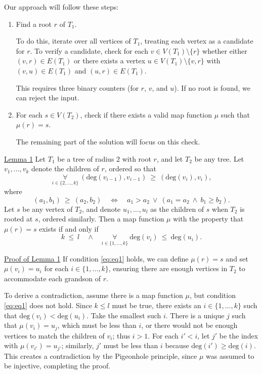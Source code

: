 \documentclass[12pt]{article}
\begin{document}
	Our approach will follow these steps:
	\begin{enumerate}
		\item Find a root \(r\) of \(T_{1}\).
		      
		      To do this, iterate over all vertices of \(T_{1}\), treating each
		      vertex as a candidate for \(r\). To verify a candidate, check for
		      each \(v \in V(T_{1}) \setminus \{r\}\) whether either \((v, r)
		      \in E(T_{1})\) or there exists a vertex \(u \in V(T_{1}) \setminus
		      \{v, r\}\) with \((v, u) \in E(T_{1})\) and \((u, r) \in
		      E(T_{1})\).
		      
		      This requires three binary counters (for \(r\), \(v\), and \(u\)).
		      If no root is found, we can reject the input.
		
		\item For each \(s \in V(T_{2})\), check if there exists a valid map
		      function \(\mu\) such that \(\mu(r) = s\).
		      
		      The remaining part of the solution will focus on this check.
	\end{enumerate}
	
	\underline{Lemma 1} Let \(T_{1}\) be a tree of radius \(2\) with root \(r\),
	and let \(T_{2}\) be any tree. Let \(v_{1}, \ldots, v_{k}\) denote the
	children of \(r\), ordered so that
	\[ \underset{i \in \{2, \ldots, k\}}{\forall} \ (\text{deg}(v_{i - 1}),
	v_{i - 1}) \ \geqslant \ (\text{deg}(v_{i}), v_{i}) \text{,} \]
	where
	\[ (a_{1}, b_{1}) \ \geqslant \ (a_{2}, b_{2}) \quad \iff \quad a_{1} >
	a_{2} \ \vee \ (a_{1} = a_{2} \ \wedge \ b_{1} \geqslant b_{2}) \text{.} \]
	Let \(s\) be any vertex of \(T_{2}\), and denote \(u_{1}, \ldots, u_{l}\)
	as the children of \(s\) when \(T_{2}\) is rooted at \(s\), ordered
	similarly. Then a map function \(\mu\) with the property that \(\mu(r) = s\)
	exists if and only if
	\begin{equation} \label{eq:eq1}
		k \ \leqslant \ l \quad \wedge \quad \underset{i \in \{1, \ldots, k\}}
		{\forall} \ \text{deg}(v_{i}) \ \leqslant \ \text{deg}(u_{i}) \text{.}
	\end{equation}
	
	\underline{Proof of Lemma 1} If condition \ref{eq:eq1} holds, we can define
	\(\mu(r) = s\) and set \(\mu(v_{i}) = u_{i}\) for each \(i \in \{1, \ldots,
	k\}\), ensuring there are enough vertices in \(T_{2}\) to accommodate each
	grandson of \(r\).
	
	\medskip
	
	To derive a contradiction, assume there is a map function \(\mu\), but
	condition \ref{eq:eq1} does not hold. Since \(k \leqslant l\) must be true,
	there exists an \(i \in \{1, \ldots, k\}\) such that \(\text{deg}(v_{i}) <
	\text{deg}(u_{i})\). Take the smallest such \(i\). There is a unique \(j\)
	such that \(\mu(v_{i}) = u_{j}\), which must be less than \(i\), or there
	would not be enough vertices to match the children of \(v_{i}\); thus \(i >
	1\). For each \(i' < i\), let \(j'\) be the index with \(\mu(v_{i'}) =
	u_{j'}\); similarly, \(j'\) must be less than \(i\) because \(\text{deg}(i')
	\geqslant \text{deg}(i)\). This creates a contradiction by the Pigeonhole
	principle, since \(\mu\) was assumed to be injective, completing the proof.
	
\end{document}
